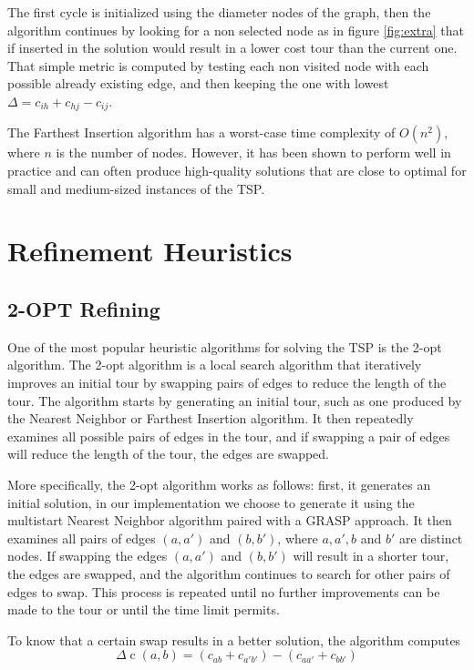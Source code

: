 The first cycle is initialized using the diameter nodes of the graph, then the algorithm continues by looking for a non selected node as in figure \ref{fig:extra} that if inserted in the solution would result in a lower cost tour than the current one.
That simple metric is computed by testing each non visited node with each possible already existing edge, and then keeping the one with lowest $\Delta = c_{ih} + c_{hj} - c_{ij}$.

The Farthest Insertion algorithm has a worst-case time complexity of $O(n^2)$, where $n$ is the number of nodes. However, it has been shown to perform well in practice and can often produce high-quality solutions that are close to optimal for small and medium-sized instances of the TSP.

\section{Refinement Heuristics}
\subsection{2-OPT Refining}\label{2OPT}
One of the most popular heuristic algorithms for solving the TSP is the 2-opt algorithm.
The 2-opt algorithm is a local search algorithm that iteratively improves an initial tour by swapping pairs of edges to reduce the length of the tour. The algorithm starts by generating an initial tour, such as one produced by the Nearest Neighbor or Farthest Insertion algorithm. It then repeatedly examines all possible pairs of edges in the tour, and if swapping a pair of edges will reduce the length of the tour, the edges are swapped.

More specifically, the 2-opt algorithm works as follows: first, it generates an initial solution, in our implementation we choose to generate it using the multistart Nearest Neighbor algorithm paired with a GRASP approach. It then examines all pairs of edges $(a,a')$ and $(b,b')$, where $a,a',b$ and $b'$ are distinct nodes. If swapping the edges $(a,a')$ and $(b,b')$ will result in a shorter tour, the edges are swapped, and the algorithm continues to search for other pairs of edges to swap. This process is repeated until no further improvements can be made to the tour or until the time limit permits.

To know that a certain swap results in a better solution, the algorithm computes 
\begin{equation}\label{eq:delta}
\Delta \operatorname{c}(a,b) = (c_{ab} + c_{a'b'}) - (c_{aa'} + c_{bb'})
\end{equation}

